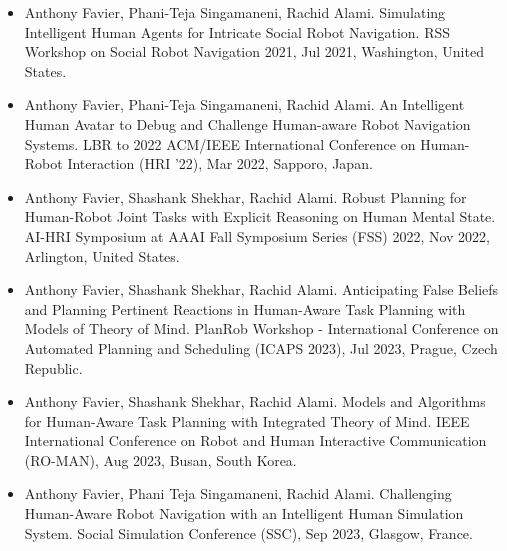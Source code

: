 \begin{itemize}

    \item Anthony Favier, Phani-Teja Singamaneni, Rachid Alami. Simulating Intelligent Human Agents for Intricate Social Robot Navigation. RSS Workshop on Social Robot Navigation 2021, Jul 2021, Washington, United States. 
    \item Anthony Favier, Phani-Teja Singamaneni, Rachid Alami. An Intelligent Human Avatar to Debug and Challenge Human-aware Robot Navigation Systems. LBR to 2022 ACM/IEEE International Conference on Human-Robot Interaction (HRI '22), Mar 2022, Sapporo, Japan. 
    \item Anthony Favier, Shashank Shekhar, Rachid Alami. Robust Planning for Human-Robot Joint Tasks with Explicit Reasoning on Human Mental State. AI-HRI Symposium at AAAI Fall Symposium Series (FSS) 2022, Nov 2022, Arlington, United States. 
    \item Anthony Favier, Shashank Shekhar, Rachid Alami. Anticipating False Beliefs and Planning Pertinent Reactions in Human-Aware Task Planning with Models of Theory of Mind. PlanRob Workshop - International Conference on Automated Planning and Scheduling (ICAPS 2023), Jul 2023, Prague, Czech Republic. 
    \item Anthony Favier, Shashank Shekhar, Rachid Alami. Models and Algorithms for Human-Aware Task Planning with Integrated Theory of Mind. IEEE International Conference on Robot and Human Interactive Communication (RO-MAN), Aug 2023, Busan, South Korea. 
    \item Anthony Favier, Phani Teja Singamaneni, Rachid Alami. Challenging Human-Aware Robot Navigation with an Intelligent Human Simulation System. Social Simulation Conference (SSC), Sep 2023, Glasgow, France. 
    
    

\end{itemize}
